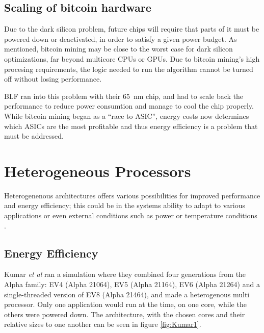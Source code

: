 
\subsection{Scaling of bitcoin hardware}
Due to the dark silicon problem, future chips will require that parts of it must be powered down or deactivated,
in order to satisfy a given power budget\cite{dark-silicon2}. As mentioned, bitcoin mining may be close to
the worst case for dark silicon optimizations, far beyond multicore CPUs or GPUs. Due to bitcoin mining's high procesing requirements, the logic needed to run the algorithm cannot be turned off without losing
performance.

BLF ran into this problem with their 65~nm chip, and had to scale back the performance to reduce power consumtion
and manage to cool the chip properly. While bitcoin mining began as a ``race to ASIC'', energy costs now determines
which ASICs are the most profitable and thus energy efficiency is a problem that must be addressed. \cite{bespoke-silicon}

\section{Heterogeneous Processors}

Heterogenenous architectures offers various possibilities for improved performance and energy efficiency;
this could be in the systems ability to adapt to various applications or even external conditions such as
power or temperature conditions \cite{heterogeneous-ee, heterogeneous-perf, heterogeneous-arch}.


\subsection{Energy Efficiency}
\label{subsec:rw_ee} 
Kumar \textit{et al}\cite{heterogeneous-ee} ran a simulation where they combined four generations from the Alpha family: EV4 (Alpha 21064), EV5 (Alpha 21164), EV6 (Alpha 21264) and a single-threaded version of EV8 (Alpha 21464), and made a heterogenous multi processor.
Only one application would run at the time, on one core, while the others were powered down.
The architecture, with the chosen cores and their relative sizes to one another can be seen in figure
\ref{fig:Kumar1}.

